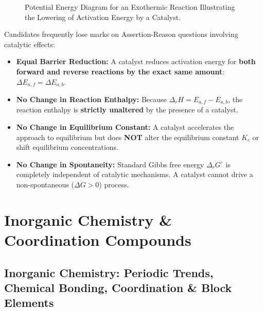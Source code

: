 \documentclass[10pt,twoside,openright]{book}
\begin{document}
\begin{figure}[htbp]
\caption{Potential Energy Diagram for an Exothermic Reaction Illustrating the Lowering of Activation Energy by a Catalyst.}
\label{fig:activation_energy_catalyst}
\end{figure}

\begin{trapbox}
Candidates frequently lose marks on Assertion-Reason questions involving catalytic effects:
\begin{itemize}
  \item \textbf{Equal Barrier Reduction:} A catalyst reduces activation energy for \textbf{both forward and reverse reactions by the exact same amount}: $\Delta E_{a,f} = \Delta E_{a,b}$.
  \item \textbf{No Change in Reaction Enthalpy:} Because $\Delta_r H = E_{a,f} - E_{a,b}$, the reaction enthalpy is \textbf{strictly unaltered} by the presence of a catalyst.
  \item \textbf{No Change in Equilibrium Constant:} A catalyst accelerates the approach to equilibrium but does \textbf{NOT} alter the equilibrium constant $K_c$ or shift equilibrium concentrations.
  \item \textbf{No Change in Spontaneity:} Standard Gibbs free energy $\Delta_r G^\circ$ is completely independent of catalytic mechanisms. A catalyst cannot drive a non-spontaneous ($\Delta G > 0$) process.
\end{itemize}
\end{trapbox}

\part{Inorganic Chemistry \& Coordination Compounds}

\chapter{Inorganic Chemistry: Periodic Trends, Chemical Bonding, Coordination \& Block Elements}
\end{document}

